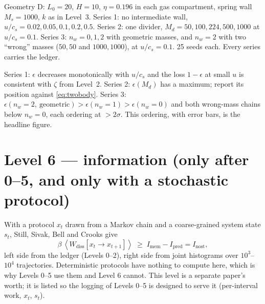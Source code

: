 \documentclass[11pt,a4paper]{article}
\newcommand{\avg}[1]{\left\langle #1 \right\rangle}
\begin{document}
\begin{run}
Geometry D: $L_0 = 20$, $H = 10$, $\eta = 0.196$ in each gas compartment, spring wall $M_s = 1000$, $k$ as in Level~3. Series 1: no intermediate wall, $u/c_s = 0.02, 0.05, 0.1, 0.2, 0.5$. Series 2: one divider, $M_d = 50, 100, 224, 500, 1000$ at $u/c_s = 0.1$. Series 3: $n_w = 0, 1, 2$ with geometric masses, and $n_w = 2$ with two ``wrong'' masses ($50, 50$ and $1000, 1000$), at $u/c_s = 0.1$. 25 seeds each. Every series carries the ledger.
\end{run}
\begin{pass}
Series 1: $\epsilon$ decreases monotonically with $u/c_s$ and the loss $1 - \epsilon$ at small $u$ is consistent with $\zeta$ from Level~2. Series 2: $\epsilon(M_d)$ has a maximum; report its position against \eqref{eq:twobody}. Series 3: $\epsilon(n_w = 2,\ \text{geometric}) > \epsilon(n_w = 1) > \epsilon(n_w = 0)$ and both wrong-mass chains below $n_w = 0$, each ordering at $> 2\sigma$. This ordering, with error bars, is the headline figure.
\end{pass}

\section{Level 6 --- information (only after 0--5, and only with a stochastic protocol)}
With a protocol $x_t$ drawn from a Markov chain and a coarse-grained system state $s_t$, Still, Sivak, Bell and Crooks give
\begin{equation}
\beta\,\avg{W_{\mathrm{diss}}[x_t \to x_{t+1}]} \;\ge\; I_{\mathrm{mem}} - I_{\mathrm{pred}} = I_{\mathrm{nost}},
\label{eq:still}
\end{equation}
left side from the ledger (Levels 0--2), right side from joint histograms over $10^3$--$10^4$ trajectories. Deterministic protocols have nothing to compute here, which is why Levels 0--5 use them and Level 6 cannot. This level is a separate paper's worth; it is listed so the logging of Levels 0--5 is designed to serve it (per-interval work, $x_t$, $s_t$).
\end{document}
